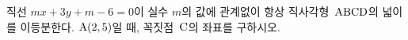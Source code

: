 직선 $mx+3y+m-6=0$이 실수 $m$의 값에 관계없이 항상 직사각형~$\mathrm{ABCD}$의 넓이를 이등분한다. $\mathrm{A}(2{,}\mkern3mu\mathopen{}5)$일 때, 꼭짓점~$\mathrm{C}$의 좌표를 구하시오.
